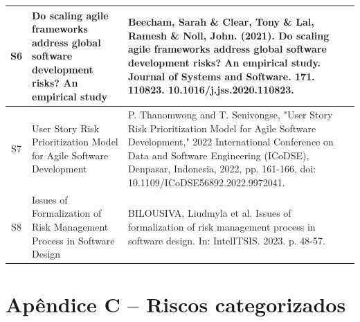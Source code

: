 \documentclass[
	12pt,
	openright,
	twoside,
	a4paper,
	english,
	brazil
	]{abntex2}
\begin{document}
\begin{longtable}{|c|p{5.5cm}|p{7.5cm}|}
  \hline
  S6 & Do scaling agile frameworks address global software development risks? An empirical study & Beecham, Sarah \& Clear, Tony \& Lal, Ramesh \& Noll, John. (2021). Do scaling agile frameworks address global software development risks? An empirical study. Journal of Systems and Software. 171. 110823. 10.1016/j.jss.2020.110823. \\
  \hline
  S7 & User Story Risk Prioritization Model for Agile Software Development & P. Thanomwong and T. Senivongse, "User Story Risk Prioritization Model for Agile Software Development," 2022 International Conference on Data and Software Engineering (ICoDSE), Denpasar, Indonesia, 2022, pp. 161-166, doi: 10.1109/ICoDSE56892.2022.9972041. \\
  \hline
  S8 & Issues of Formalization of Risk Management Process in Software Design & BILOUSIVA, Liudmyla et al. Issues of formalization of risk management process in software design. In: IntelITSIS. 2023. p. 48-57. \\
  \hline
\end{longtable}

\chapter*{Apêndice C – Riscos categorizados}
\label{apendiceC}

\vspace{-2em} %

\end{document}
